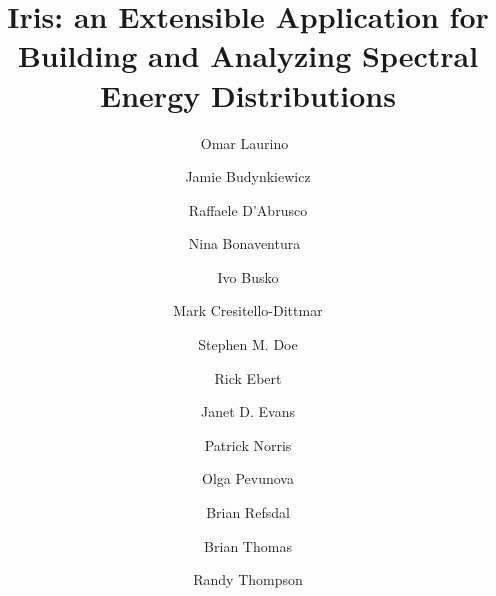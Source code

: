 \documentclass[5p]{elsarticle}
\begin{document}
\begin{frontmatter}



\title{Iris: an Extensible Application for Building and Analyzing Spectral Energy Distributions}

\author[sao]{Omar Laurino~}

\author[sao]{Jamie Budynkiewicz}

\author[sao]{Raffaele D'Abrusco}

\author[sao]{Nina Bonaventura~}

\author[stsci]{Ivo Busko}

\author[sao]{Mark Cresitello-Dittmar}

\author[sao]{Stephen M. Doe}

\author[ipac]{Rick Ebert}

\author[sao]{Janet D. Evans}

\author[noao]{Patrick Norris}

\author[ipac]{Olga Pevunova}

\author[sao]{Brian Refsdal}

\author[noao]{Brian Thomas}

\author[stsci]{Randy Thompson}


\end{frontmatter}
\end{document}
